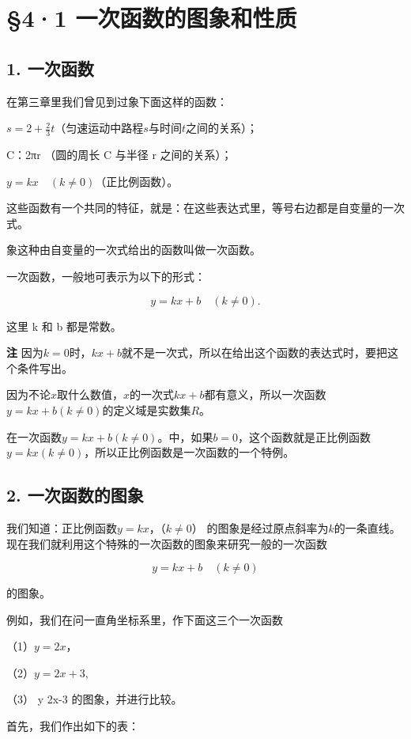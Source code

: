 \section{§4·1 一次函数的图象和性质}

\subsection{1. 一次函数}

在第三章里我们曾见到过象下面这样的函数：

\(s = 2 + \frac{2}{3} t\)（匀速运动中路程\(s\)与时间\(t\)之间的关系）；

C：2πr （圆的周长 C 与半径 r 之间的关系）；

\(y = kx \quad (k \neq 0)\)（正比例函数）。

这些函数有一个共同的特征，就是：在这些表达式里，等号右边都是自变量的一次式。

象这种由自变量的一次式给出的函数叫做一次函数。

一次函数，一般地可表示为以下的形式：

\[
y = k x + b \quad (k \neq 0).
\]

这里 k 和 b 都是常数。

\textbf{注}
因为\(k = 0\)时，\(kx + b\)就不是一次式，所以在给出这个函数的表达式时，要把这个条件写出。

因为不论\(x\)取什么数值，\(x\)的一次式\(kx + b\)都有意义，所以一次函数\(y = kx + b (k \neq 0)\)的定义域是实数集\(R\)。

在一次函数\(y = kx + b (k \neq 0)\)。中，如果\(b = 0\)，这个函数就是正比例函数\(y = kx (k \neq 0)\)，所以正比例函数是一次函数的一个特例。

\subsection{2. 一次函数的图象}

我们知道：正比例函数\(y = kx\)，（\(k \neq 0\)）
的图象是经过原点斜率为\(k\)的一条直线。现在我们就利用这个特殊的一次函数的图象来研究一般的一次函数

\[
y = k x + b \quad (k \neq 0)
\]

的图象。

例如，我们在问一直角坐标系里，作下面这三个一次函数

（1）\(y=2x\)，

（2）\(y = 2x + 3,\)

（3） y 2x-3 的图象，并进行比较。

首先，我们作出如下的表：


